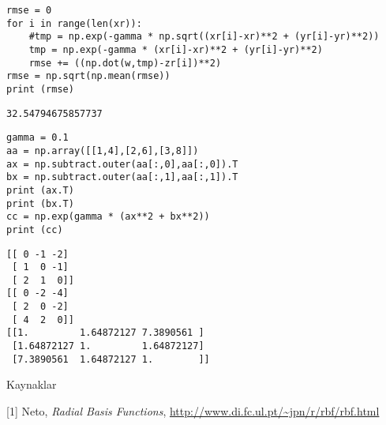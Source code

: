 \documentclass[12pt,fleqn]{article}\usepackage{../../common}
\begin{document}
\begin{verbatim}
rmse = 0
for i in range(len(xr)):
    #tmp = np.exp(-gamma * np.sqrt((xr[i]-xr)**2 + (yr[i]-yr)**2))
    tmp = np.exp(-gamma * (xr[i]-xr)**2 + (yr[i]-yr)**2)
    rmse += ((np.dot(w,tmp)-zr[i])**2)
rmse = np.sqrt(np.mean(rmse))
print (rmse)
\end{verbatim}

\begin{verbatim}
32.54794675857737
\end{verbatim}

















\begin{verbatim}
gamma = 0.1
aa = np.array([[1,4],[2,6],[3,8]])
ax = np.subtract.outer(aa[:,0],aa[:,0]).T
bx = np.subtract.outer(aa[:,1],aa[:,1]).T
print (ax.T)
print (bx.T)
cc = np.exp(gamma * (ax**2 + bx**2))
print (cc)
\end{verbatim}

\begin{verbatim}
[[ 0 -1 -2]
 [ 1  0 -1]
 [ 2  1  0]]
[[ 0 -2 -4]
 [ 2  0 -2]
 [ 4  2  0]]
[[1.         1.64872127 7.3890561 ]
 [1.64872127 1.         1.64872127]
 [7.3890561  1.64872127 1.        ]]
\end{verbatim}














Kaynaklar

[1] Neto, {\em Radial Basis Functions}, \url{http://www.di.fc.ul.pt/~jpn/r/rbf/rbf.html}
\end{document}
